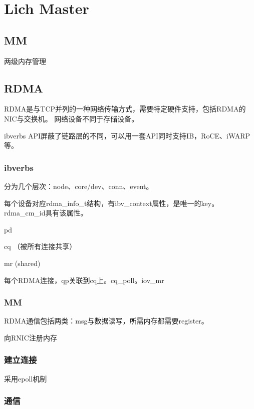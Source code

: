 \chapter{Lich Master}

\section{MM}

两级内存管理

\section{RDMA}

RDMA是与TCP并列的一种网络传输方式，需要特定硬件支持，包括RDMA的NIC与交换机。
网络设备不同于存储设备。

ibverbs API屏蔽了链路层的不同，可以用一套API同时支持IB，RoCE、iWARP等。

\subsection{ibverbs}

分为几个层次：node、core/dev、conn、event。

每个设备对应rdma\_info\_t结构，有ibv\_context属性，是唯一的key。rdma\_cm\_id具有该属性。

\begin{itembox}
\item pd
\item cq （被所有连接共享）
\item mr  (shared)
\end{itembox}

每个RDMA连接，qp关联到cq上。cq\_poll。iov\_mr

\subsection{MM}

RDMA通信包括两类：msg与数据读写，所需内存都需要register。

向RNIC注册内存

\subsection{建立连接}

采用epoll机制

\subsection{通信}

